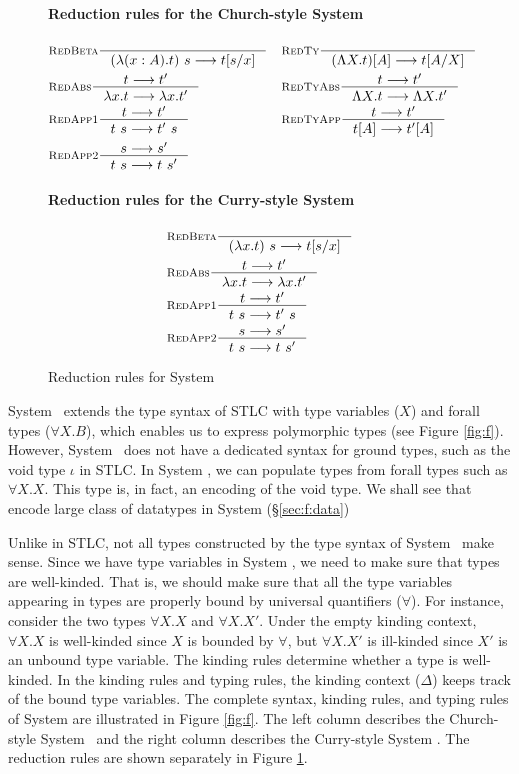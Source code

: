 \begin{figure}
\paragraph{Reduction rules for the Church-style System \F}
\begin{align*}
& \inference[\sc RedBeta]{}{(\l(x:A).t)~s --> t[s/x]}
&&\inference[\sc RedTy]{}{(\L X   .t)[A] --> t[A/X]} \\
& \inference[\sc RedAbs]{t --> t'}{\l x   .t --> \l x   .t'}
&&\inference[\sc RedTyAbs]{t --> t'}{\L X   .t --> \L X   .t'} \\
& \inference[\sc RedApp1]{t --> t'}{t~s --> t'~s}
&&\inference[\sc RedTyApp]{t --> t'}{t[A] --> t'[A]} \\
& \inference[\sc RedApp2]{s --> s'}{t~s --> t~s'}
\end{align*}
\paragraph{Reduction rules for the Curry-style System \F}
\begin{align*}
& \inference[\sc RedBeta]{}{(\l x   .t)~s --> t[s/x]} \\
& \inference[\sc RedAbs]{t --> t'}{\l x   .t --> \l x   .t'} \\
& \inference[\sc RedApp1]{t --> t'}{t~s --> t'~s} \\
& \inference[\sc RedApp2]{s --> s'}{t~s --> t~s'}
\end{align*}
\caption{Reduction rules for System \F}
\label{fig:redf}
\end{figure}

System \F\ extends the type syntax of STLC with type variables ($X$)
and forall types ($\forall X.B$), which enables us to express polymorphic types
(see Figure \ref{fig:f}). However, System \F\ does not have a dedicated syntax
for ground types, such as the void type $\iota$ in STLC. In System \F, we can
populate types from forall types such as $\forall X.X$. This type is, in fact,
an encoding of the void type. We shall see that encode large class of datatypes
in System \F (\S\ref{sec:f:data})

Unlike in STLC, not all types constructed by the type syntax of System \F\
make sense. Since we have type variables in System \F, we need to
make sure that types are well-kinded. That is, we should make sure
that all the type variables appearing in types are properly bound by
universal quantifiers ($\forall$). For instance, consider the two types
$\forall X.X$ and $\forall X.X'$. Under the empty kinding context,
$\forall X.X$ is well-kinded since $X$ is bounded by $\forall$, but
$\forall X.X'$ is ill-kinded since $X'$ is an unbound type variable.
The kinding rules determine whether a type is well-kinded.
In the kinding rules and typing rules, the kinding context ($\Delta$)
keeps track of the bound type variables. The complete syntax, kinding rules,
and typing rules of System \F are illustrated in Figure \ref{fig:f}.
The left column describes the Church-style System \F\ and the right
column describes the Curry-style System \F. The reduction rules are
shown separately in Figure \ref{fig:redf}.

